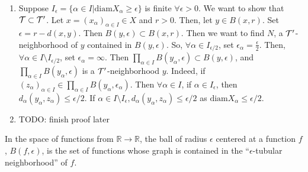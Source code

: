 \begin{myproof}
\begin{enumerate}
		\item Suppose $I_\epsilon = \{\alpha\in I|\text{diam}X_\alpha\geq\epsilon\}$ is finite $\forall\epsilon > 0$. We want to show that $\mathcal{T}\subset\mathcal{T}'$. Let $x = (x_\alpha)_{\alpha\in I}\in X$ and $r > 0$. Then, let $y\in B(x,r)$. Set $\epsilon = r - d(x,y)$. Then $B(y,\epsilon)\subset B(x,r)$. Then we want to find $N$, a $\mathcal{T}'$-neighborhood of $y$ contained in $B(y,\epsilon)$. So, $\forall\alpha\in I_{\epsilon/2}$, set $\epsilon_\alpha = \frac{\epsilon}{2}$. Then, $\forall \alpha\in I\setminus I_{\epsilon / 2}$, set $\epsilon_\alpha = \infty$. Then $\prod_{\alpha\in I}B(y_\alpha,\epsilon)\subset B(y,\epsilon)$, and $\prod_{\alpha\in I}B(y_\alpha,\epsilon)$ is a $\mathcal{T}'$-neighborhood $y$. Indeed, if $(z_\alpha)_{\alpha\in I}\in\prod_{\alpha\in I}B(y_\alpha,\epsilon_\alpha)$. Then $\forall\alpha\in I$, if $\alpha\in I_{\epsilon}$, then $d_{\alpha}(y_\alpha,z_\alpha) \leq \epsilon/2$. If $\alpha\in I \setminus I_\epsilon, d_{\alpha}(y_\alpha,z_\alpha)\leq \epsilon/2$ as $\text{diam}X_\alpha\leq \epsilon/2$.
		
		\item TODO: finish proof later
	\end{enumerate}
\end{myproof}



\begin{note}
	In the space of functions from $\mathbb{R}\to\mathbb{R}$, the ball of radius $\epsilon$ centered at a function $f$, $B(f,\epsilon)$, is the set of functions whose graph is contained in the ``$\epsilon$-tubular neighborhood'' of $f$.
\end{note}

